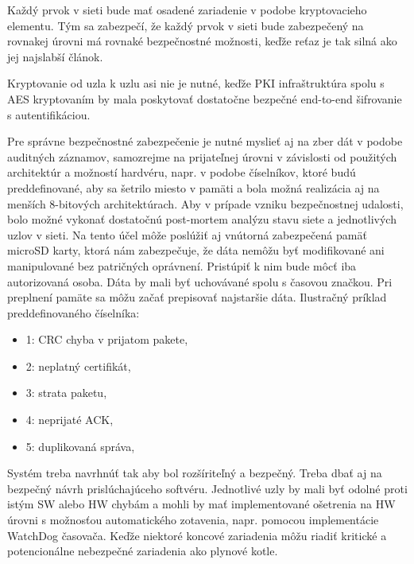 \documentclass[12pt,a4paper,oneside,openright]{report}
\begin{document}
Každý prvok v sieti bude mať osadené zariadenie v podobe kryptovacieho elementu. Tým sa zabezpečí, že každý prvok v sieti bude zabezpečený na rovnakej úrovni má rovnaké bezpečnostné možnosti, keďže reťaz je tak silná ako jej najslabší článok.

Kryptovanie od uzla k uzlu asi nie je nutné, keďže PKI infraštruktúra spolu s AES kryptovaním by mala poskytovať dostatočne bezpečné end-to-end šifrovanie s autentifikáciou.

Pre správne bezpečnostné zabezpečenie je nutné myslieť aj na zber dát v podobe auditných záznamov, samozrejme na prijateľnej úrovni v závislosti od použitých architektúr a možností hardvéru, napr. v podobe číselníkov, ktoré budú preddefinované, aby sa šetrilo miesto v pamäti a bola možná realizácia aj na menších 8-bitových architektúrach. Aby v prípade vzniku bezpečnostnej udalosti, bolo možné vykonať dostatočnú post-mortem analýzu stavu siete a jednotlivých uzlov v sieti. Na tento účel môže poslúžiť aj vnútorná zabezpečená pamäť microSD karty, ktorá nám zabezpečuje, že dáta nemôžu byť  modifikované ani manipulované bez patričných oprávnení. Pristúpiť k nim bude môcť iba autorizovaná osoba. Dáta by mali byť uchovávané spolu s časovou značkou. Pri preplnení pamäte sa môžu začať prepisovať najstaršie dáta.
Ilustračný príklad preddefinovaného číselníka:
\begin{itemize}
	\item 1: CRC chyba v prijatom pakete,
	\item 2: neplatný certifikát,
	\item 3: strata paketu, 
	\item 4: neprijaté ACK,
	\item 5: duplikovaná správa,
\end{itemize}
\onehalfspacing

Systém treba navrhnúť tak aby bol rozšíriteľný a bezpečný. Treba dbať aj na bezpečný návrh prislúchajúceho softvéru.
Jednotlivé uzly by mali byť odolné proti istým SW alebo HW chybám a mohli by mať implementované ošetrenia na HW úrovni s možnosťou automatického zotavenia, napr. pomocou implementácie WatchDog časovača. Keďže niektoré koncové zariadenia môžu riadiť kritické a potencionálne nebezpečné zariadenia ako plynové kotle.
\end{document}
